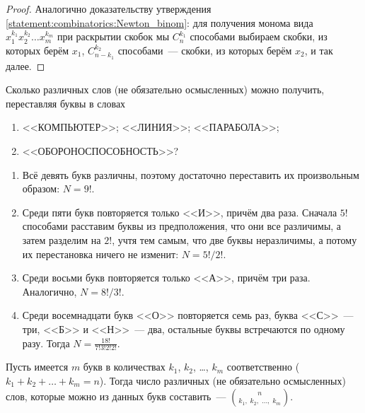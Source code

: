 \begin{proof}
    Аналогично доказательству утверждения \ref{statement:combinatorics:Newton_binom}:
    для получения монома вида $ x_1^{k_1} x_2^{k_2} \ldots x_m^{k_m} $ при раскрытии скобок
    мы $ C_n^{k_1} $ способами выбираем скобки, из которых берём $ x_1 $, $ C_{n-k_1}^{k_2} $ способами~--- скобки, из которых берём $ x_2 $, и так далее.
\end{proof}

\begin{Exercise}[counter=SecExercise]
    \noindent
    Сколько различных слов (не обязательно осмысленных) можно получить, переставляя буквы в словах
    \begin{enumerate}[label=\textbf{\alph*)}]
        \item <<КОМПЬЮТЕР>>;
        \inlineitem <<ЛИНИЯ>>;
        \inlineitem <<ПАРАБОЛА>>;
        \item <<ОБОРОНОСПОСОБНОСТЬ>>?
    \end{enumerate}
\end{Exercise}

\begin{Answer}
    \noindent
    \begin{enumerate}[label=\textbf{\alph*)}]
        \item
            Всё девять букв различны, поэтому достаточно переставить их произвольным образом: $ N = 9! $.
        \item
            Среди пяти букв повторяется только <<И>>, причём два раза.
            Сначала $ 5! $ способами расставим буквы из предположения, что они все различимы,
            а затем разделим на $ 2! $, учтя тем самым, что две буквы неразличимы, а потому их перестановка ничего не изменит: $ N = 5! / 2! $.
        \item
            Среди восьми букв повторяется только <<А>>, причём три раза.
            Аналогично, $ N = 8! / 3! $.
        \item
            Среди восемнадцати букв <<О>> повторяется семь раз, буква <<С>>~--- три, <<Б>> и <<Н>>~---  два, остальные буквы встречаются по одному разу.
            Тогда $ \displaystyle N = \frac{18!}{7! 3! 2! 2!} $.
    \end{enumerate}
\end{Answer}

\begin{remark}
    Пусть имеется $ m $ букв в количествах $ k_1 $, $ k_2 $, \ldots, $ k_m $ соответственно ($ k_1 + k_2 + \ldots + k_m = n $).
    Тогда число различных (не обязательно осмысленных) слов, которые можно из данных букв составить~--- $ \binom{n}{k_1, \; k_2, \; \ldots, \; k_m} $.
\end{remark}
